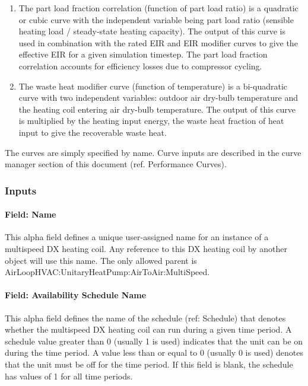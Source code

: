 \begin{enumerate}
\item
  The part load fraction correlation (function of part load ratio) is a quadratic or cubic curve with the independent variable being part load ratio (sensible heating load / steady-state heating capacity). The output of this curve is used in combination with the rated EIR and EIR modifier curves to give the effective EIR for a given simulation timestep. The part load fraction correlation accounts for efficiency losses due to compressor cycling.
\item
  The waste heat modifier curve (function of temperature) is a bi-quadratic curve with two independent variables: outdoor air dry-bulb temperature and the heating coil entering air dry-bulb temperature. The output of this curve is multiplied by the heating input energy, the waste heat fraction of heat input to give the recoverable waste heat.
\end{enumerate}

The curves are simply specified by name. Curve inputs are described in the curve manager section of this document (ref. Performance Curves).

\subsubsection{Inputs}\label{inputs-20-001}

\paragraph{Field: Name}\label{field-name-19-001}

This alpha field defines a unique user-assigned name for an instance of a multispeed DX heating coil. Any reference to this DX heating coil by another object will use this name. The only allowed parent is AirLoopHVAC:UnitaryHeatPump:AirToAir:MultiSpeed.

\paragraph{Field: Availability Schedule Name}\label{field-availability-schedule-name-11-000}

This alpha field defines the name of the schedule (ref: Schedule) that denotes whether the multispeed DX heating coil can run during a given time period. A schedule value greater than 0 (usually 1 is used) indicates that the unit can be on during the time period. A value less than or equal to 0 (usually 0 is used) denotes that the unit must be off for the time period. If this field is blank, the schedule has values of 1 for all time periods.

